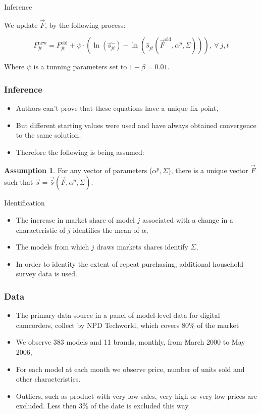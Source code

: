 \documentclass{beamer}
\theoremstyle{definition}
\newtheorem{assump}{Assumption}
\begin{document}
\begin{frame}{Inference}

  We update $\vec{F}$, by the following process:

  \[
    F_{jt}^{\text{new}} = F_{jt}^{\text{old}} + \psi \cdot \left(
      \ln(\hat{s_{jt}}) - \ln \left( \hat{s}_{jt}\left( \vec{F}^{\text{old}},
          \alpha^p, \Sigma \right) \right) \right),\ \forall\ j,t
  \]

  Where $\psi$ is a tunning parameters set to $1 - \beta = 0.01$.
\end{frame}

\begin{frame}
  \frametitle{Inference}

  \begin{itemize}
    \item Authors can't prove that these equations have a unique fix point,
    \item But different starting values were used and have always obtained
      convergence to the same solution.
    \item Therefore the following is being assumed:
  \end{itemize}

  \begin{assump}
    For any vector of parameters ($\alpha^p, \Sigma$), there is a unique vector
    $\vec{F}$ such that $\vec{s} = \vec{\hat{s}}\left(\vec{F}, \alpha^p,
      \Sigma\right)$.
  \end{assump}
\end{frame}

\begin{frame}[t]{Identification}
  \begin{itemize}
    \item The increase in market share of model $ j$ associated with a change
      in a characteristic of $ j$ identifies the mean of $\alpha$,
    \item The models from which $ j$ draws markets shares identify $\Sigma$,
    \item In order to identity the extent of repeat purchasing, additional 
      household survey data is used.
\end{itemize}
\end{frame}

\begin{frame}
  \frametitle{Data}

  \begin{itemize}
    \item The primary data source in a panel of model-level data for digital
      camcorders, collect by NPD Techworld, which covers 80\% of the market
    \item We observe 383 models and 11 brands, monthly, from March 2000 to May 2006,
    \item For each model at each month we observe price, number of units sold and
      other characteristics.
    \item Outliers, such as product with very low sales, very high or very low prices
      are excluded. Less then 3\% of the date is excluded this way.
  \end{itemize}
\end{frame}
\end{document}
